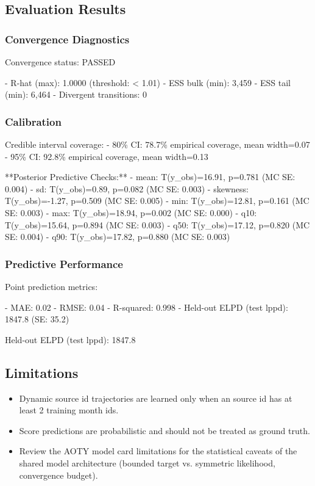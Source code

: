 \documentclass{article}
\begin{document}
\subsection*{Evaluation Results}

\subsubsection*{Convergence Diagnostics}
Convergence status: PASSED

- R-hat (max): 1.0000 (threshold: < 1.01)
- ESS bulk (min): 3,459
- ESS tail (min): 6,464
- Divergent transitions: 0

\subsubsection*{Calibration}
Credible interval coverage:
- 80\% CI: 78.7\% empirical coverage, mean width=0.07
- 95\% CI: 92.8\% empirical coverage, mean width=0.13

**Posterior Predictive Checks:**
- mean: T(y\_obs)=16.91, p=0.781 (MC SE: 0.004)
- sd: T(y\_obs)=0.89, p=0.082 (MC SE: 0.003)
- skewness: T(y\_obs)=-1.27, p=0.509 (MC SE: 0.005)
- min: T(y\_obs)=12.81, p=0.161 (MC SE: 0.003)
- max: T(y\_obs)=18.94, p=0.002 (MC SE: 0.000)
- q10: T(y\_obs)=15.64, p=0.894 (MC SE: 0.003)
- q50: T(y\_obs)=17.12, p=0.820 (MC SE: 0.004)
- q90: T(y\_obs)=17.82, p=0.880 (MC SE: 0.003)

\subsubsection*{Predictive Performance}
Point prediction metrics:

- MAE: 0.02
- RMSE: 0.04
- R-squared: 0.998
- Held-out ELPD (test lppd): 1847.8 (SE: 35.2)

Held-out ELPD (test lppd): 1847.8

\subsection*{Limitations}
\begin{itemize}
  \item Dynamic source id trajectories are learned only when an source id has at least 2 training month ids.
  \item Score predictions are probabilistic and should not be treated as ground truth.
  \item Review the AOTY model card limitations for the statistical caveats of the shared model architecture (bounded target vs. symmetric likelihood, convergence budget).
\end{itemize}
\end{document}
